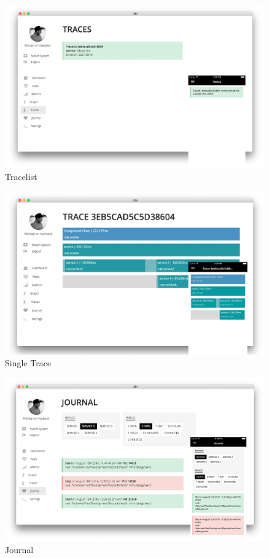 \begin{figure}[h!p]
 \centering
 \includegraphics[width=0.9\linewidth]{appendix/app/tracelist.png}
 \caption{Tracelist}
\end{figure}

\begin{figure}[h!p]
 \centering
 \includegraphics[width=0.9\linewidth]{appendix/app/trace-detail.png}
 \caption{Single Trace}
\end{figure}

\begin{figure}[h!p]
 \centering
 \includegraphics[width=0.9\linewidth]{appendix/app/journal.png}
 \caption{Journal}
\end{figure}

